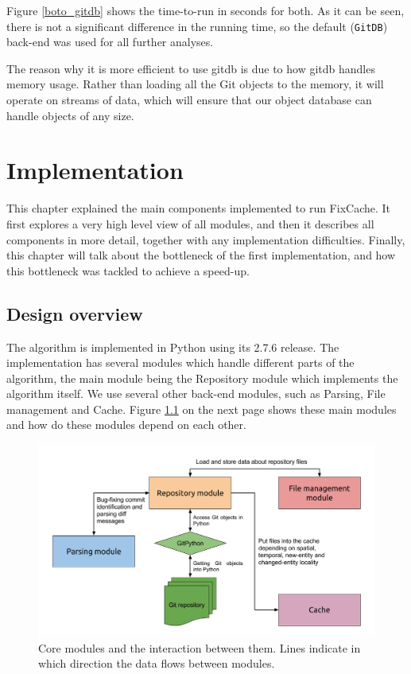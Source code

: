 \documentclass[12pt,twoside,notitlepage]{report}
\newcommand{\fxch}{FixCache}
\begin{document}
Figure \ref{boto_gitdb} shows the time-to-run in seconds for both. As it can be seen, there is not a significant difference in the running time, so the default (\texttt{GitDB}) back-end was used for all further analyses.

The reason why it is more efficient to use gitdb is due to how gitdb handles memory usage. Rather than loading all the Git objects to the memory, it will operate on streams of data, which will ensure that our object database can handle objects of any size.
\cleardoublepage
\chapter{Implementation}
This chapter explained the main components implemented to run \fxch{}. It first explores a very high level view of all modules, and then it describes all components in more detail, together with any implementation difficulties. Finally, this chapter will talk about the bottleneck of the first implementation, and how this bottleneck was tackled to achieve a speed-up.
\section{Design overview}

The algorithm is implemented in Python using its 2.7.6 release. The implementation has several modules which handle different parts of the algorithm, the main module being the Repository module which implements the algorithm itself. We use several other back-end modules, such as Parsing, File management and Cache. Figure \ref{fixcache_flowgraph} on the next page shows these main modules and how do these modules depend on each other.

\begin{figure}[h]
\includegraphics[width=1.0\textwidth]{fixcache_flowgraph.png}

\captionsetup{width=0.9\textwidth}
\caption[Core modules and the interaction between them.]{Core modules and the interaction between them. Lines indicate in which direction the data flows between modules.}
\label{fixcache_flowgraph}
\end{figure} 
\end{document}
